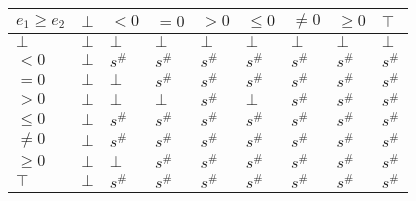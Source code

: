 \documentclass{article}
\begin{document}
                \begin{table}
                    \begin{tabular}{|l|l|l|l|l|l|l|l|l|}
                    \hline
                    $e_1 \ge e_2$ & $\bot$ & $<0$   & $=0$   & $>0$   & $\le 0$ & $\ne 0$ & $\ge 0$ & $\top$ \\ \hline
                    $\bot$        & $\bot$ & $\bot$ & $\bot$ & $\bot$ & $\bot$  & $\bot$  & $\bot$  & $\bot$ \\ \hline
                    $<0$          & $\bot$ & $s^\#$ & $s^\#$ & $s^\#$ & $s^\#$  & $s^\#$  & $s^\#$  & $s^\#$ \\ \hline
                    $=0$          & $\bot$ & $\bot$ & $s^\#$ & $s^\#$ & $s^\#$  & $s^\#$  & $s^\#$  & $s^\#$ \\ \hline
                    $>0$          & $\bot$ & $\bot$ & $\bot$ & $s^\#$ & $\bot$  & $s^\#$  & $s^\#$  & $s^\#$ \\ \hline
                    $\le 0$       & $\bot$ & $s^\#$ & $s^\#$ & $s^\#$ & $s^\#$  & $s^\#$  & $s^\#$  & $s^\#$ \\ \hline
                    $\ne 0$       & $\bot$ & $s^\#$ & $s^\#$ & $s^\#$ & $s^\#$  & $s^\#$  & $s^\#$  & $s^\#$ \\ \hline
                    $\ge 0$       & $\bot$ & $\bot$ & $s^\#$ & $s^\#$ & $s^\#$  & $s^\#$  & $s^\#$  & $s^\#$ \\ \hline
                    $\top$        & $\bot$ & $s^\#$ & $s^\#$ & $s^\#$ & $s^\#$  & $s^\#$  & $s^\#$  & $s^\#$ \\ \hline
                    \end{tabular}
                    \end{table}
\end{document}
